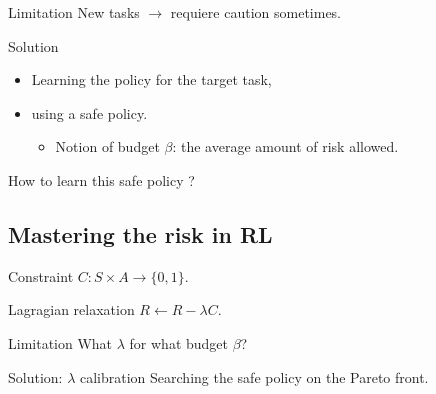 \documentclass{beamer}
\begin{document}
    \begin{frame}

        \begin{alertblock}{Limitation}
            New tasks $\rightarrow$ requiere caution sometimes.
        \end{alertblock}

        \pause
        \begin{exampleblock}{Solution}
            \begin{itemize}
                \item Learning the policy for the target task,
                \item using a safe policy.
                \begin{itemize}
                    \item Notion of budget $\beta$: the average amount of risk allowed.
                \end{itemize}
            \end{itemize}
        \end{exampleblock}
        \pause
        \begin{block}{}
            How to learn this safe policy ?
        \end{block}

    \end{frame}

    \subsection{Mastering the risk in RL}

    \begin{frame}

        \begin{block}{Constraint}
            $C:S\times A \rightarrow \{0,1\}$.
        \end{block}
        \pause
        \begin{block}{Lagragian relaxation}
            $R \leftarrow R - \lambda C$.
        \end{block}

        \pause
        \begin{alertblock}{Limitation}
            What $\lambda$ for what budget $\beta$?
        \end{alertblock}
        \pause
        \begin{exampleblock}{Solution: $\lambda$ calibration}%
            Searching the safe policy on the Pareto front.
        \end{exampleblock}


    \end{frame}
\end{document}
